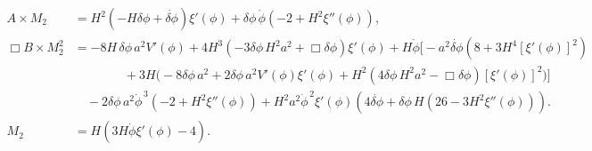\documentclass[reprint, 10pt, amsmath, amssymb, floatfix, aps, prd, superscriptaddress, nofootinbib, nobibnotes,twocolumn]{revtex4-1}
\begin{document}
\begin{widetext}
    \begin{align}
        A \times M_2 & = H^2\left(-H\delta\phi+\dot{\delta\phi}\right)\xi'(\phi)+\delta\phi\,\dot{\phi}\left(-2+H^2\xi''(\phi)\right),\label{eq:gb-pert-a-eom}\\
        \Box B \times M_2^2 & = -8H\,\delta\phi\,a^2V'(\phi)+4H^3\left(-3\delta\phi\,H^2a^2+\Box\delta\phi\right)\xi'(\phi)+H\dot{\phi}\Bigg[-a^2\dot{\delta\phi}\left(8+3H^4\left[\xi'(\phi)\right]^2\right)
        \nonumber\\
        &\qquad\qquad+3H\Bigg(-8\delta\phi\,a^2+2\delta\phi\,a^2 V'(\phi)\xi'(\phi)+H^2
        \left(4\delta\phi\,H^2a^2-\Box\delta\phi\right)\left[\xi'(\phi)\right]^2\Bigg)\Bigg]
        \nonumber\\
        &\quad-2\delta\phi\,a^2\dot{\phi}^{\,3}\left(-2+H^2\xi''(\phi)\right)+H^2a^2\dot{\phi}^{\,2}\xi'(\phi)\left(4\dot{\delta\phi}+\delta\phi\,H\left(26-3H^2\xi''(\phi)\right)\right).\label{eq:gb-pert-b-eom}\\
        M_2 & = H (3H\dot\phi\xi'(\phi) - 4).
    \end{align}
\end{widetext}


\end{document}
